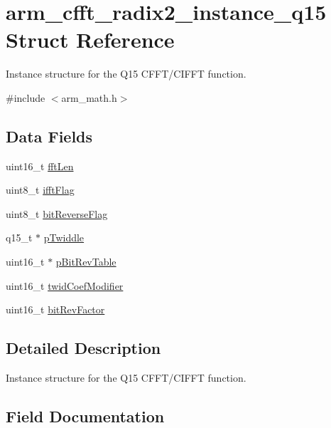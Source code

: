 \hypertarget{structarm__cfft__radix2__instance__q15}{}\section{arm\+\_\+cfft\+\_\+radix2\+\_\+instance\+\_\+q15 Struct Reference}
\label{structarm__cfft__radix2__instance__q15}


Instance structure for the Q15 C\+F\+F\+T/\+C\+I\+F\+FT function.  




{\ttfamily \#include $<$arm\+\_\+math.\+h$>$}

\subsection*{Data Fields}
\begin{DoxyCompactItemize}
\item 
uint16\+\_\+t \mbox{\hyperlink{structarm__cfft__radix2__instance__q15_ab8db3bbe7c61e6bb8ca2a55e3446e11a}{fft\+Len}}
\item 
uint8\+\_\+t \mbox{\hyperlink{structarm__cfft__radix2__instance__q15_ad6ca6e223f986ebfd94c5ee1e410aa73}{ifft\+Flag}}
\item 
uint8\+\_\+t \mbox{\hyperlink{structarm__cfft__radix2__instance__q15_a09a221a818c6d0e064557a99e2fe9a8b}{bit\+Reverse\+Flag}}
\item 
q15\+\_\+t $\ast$ \mbox{\hyperlink{structarm__cfft__radix2__instance__q15_aa8c837c05b2c910342ab8f171d30dc02}{p\+Twiddle}}
\item 
uint16\+\_\+t $\ast$ \mbox{\hyperlink{structarm__cfft__radix2__instance__q15_a46a2fb328199897af100fea0bfdf59aa}{p\+Bit\+Rev\+Table}}
\item 
uint16\+\_\+t \mbox{\hyperlink{structarm__cfft__radix2__instance__q15_afe772e5b5001c9d8e85032115a8df5bf}{twid\+Coef\+Modifier}}
\item 
uint16\+\_\+t \mbox{\hyperlink{structarm__cfft__radix2__instance__q15_a33386d95319dc3ee7097b3a8e52e01ec}{bit\+Rev\+Factor}}
\end{DoxyCompactItemize}


\subsection{Detailed Description}
Instance structure for the Q15 C\+F\+F\+T/\+C\+I\+F\+FT function. 

\subsection{Field Documentation}
\mbox{\label{structarm__cfft__radix2__instance__q15_a09a221a818c6d0e064557a99e2fe9a8b}} 
